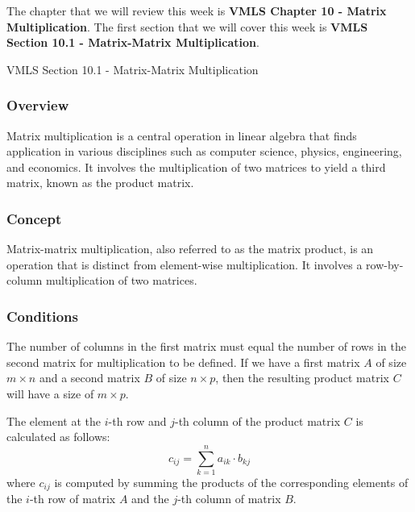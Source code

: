 The chapter that we will review this week is \textbf{VMLS Chapter 10 - Matrix Multiplication}. The first section that we will cover this week is \textbf{VMLS Section 10.1 - Matrix-Matrix Multiplication}.

\begin{notes}{VMLS Section 10.1 - Matrix-Matrix Multiplication}
    \subsubsection*{Overview}

    Matrix multiplication is a central operation in linear algebra that finds application in various disciplines such as computer science, physics, engineering, and economics. It involves the 
    multiplication of two matrices to yield a third matrix, known as the product matrix. \vspace*{1em}

    \subsubsection*{Concept}
    Matrix-matrix multiplication, also referred to as the matrix product, is an operation that is distinct from element-wise multiplication. It involves a row-by-column multiplication of two 
    matrices. \vspace*{1em}
    
    \subsubsection*{Conditions}
    The number of columns in the first matrix must equal the number of rows in the second matrix for multiplication to be defined. If we have a first matrix $A$ of size $m \times n$ 
    and a second matrix $B$ of size $n \times p$, then the resulting product matrix $C$ will have a size of $m \times p$. \vspace*{1em}

    \begin{highlight}
        The element at the $i$-th row and $j$-th column of the product matrix $C$ is calculated as follows:
        \begin{equation*}
            c_{ij} = \sum_{k=1}^{n} a_{ik} \cdot b_{kj}
        \end{equation*}
        where $c_{ij}$ is computed by summing the products of the corresponding elements of the $i$-th row of matrix $A$ and the $j$-th column of matrix $B$.

\end{highlight}
\end{notes}
